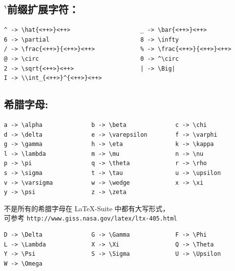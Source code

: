 \documentclass[a4paper,11pt]{article}
\begin{document}
\subsection{$\backprime$前缀扩展字符：}
\begin{Verbatim}
^ -> \hat{<++>}<++>                    _ -> \bar{<++>}<++>
6 -> \partial                          8 -> \infty
/ -> \frac{<++>}{<++>}<++>             % -> \frac{<++>}{<++>}<++>
@ -> \circ                             0 -> ^\circ
2 -> \sqrt{<++>}<++>                   | -> \Big|
I -> \\int_{<++>}^{<++>}<++>
\end{Verbatim}

\subsection{希腊字母:}
\begin{Verbatim}
a -> \alpha              b -> \beta              c -> \chi
d -> \delta              e -> \varepsilon        f -> \varphi
g -> \gamma              h -> \eta               k -> \kappa
l -> \lambda             m -> \mu                n -> \nu
p -> \pi                 q -> \theta             r -> \rho
s -> \sigma              t -> \tau               u -> \upsilon
v -> \varsigma           w -> \wedge             x -> \xi
y -> \psi                z -> \zeta
\end{Verbatim}
{\huge\textcolor{red}{\makebox[\textwidth][s]{
$\alpha{}\ \beta{}\ \chi{}\ \delta{}\ \varepsilon{}\ %
\varphi{}\ \gamma{}\ \eta{}\ \kappa{}\ \lambda{}\ \mu{}\ \nu{}\ %
\pi{}\ \theta{}\ \rho{}\ \sigma{}\ \tau{}\ \upsilon{}\ %
\varsigma{}\ \wedge{}\ \xi{}\ \psi{}\ \zeta$}}}

不是所有的希腊字母在 \LaTeX -Suite 中都有大写形式，\\
可参考 \verb+http://www.giss.nasa.gov/latex/ltx-405.html+
\begin{Verbatim}
D -> \Delta              G -> \Gamma             F -> \Phi
L -> \Lambda             X -> \Xi                Q -> \Theta
Y -> \Psi                S -> \Sigma             U -> \Upsilon
W -> \Omega
\end{Verbatim}
{\huge\makebox[0.7\textwidth][s]{\textcolor{red}{
$\Delta{}\ \Gamma{}\ \Phi{}\ \Lambda{}\ \Xi{}\ \Theta{}\ \Psi{}\ %
\Sigma{}\ \Upsilon{}\ \Omega$}}}
\end{document}
